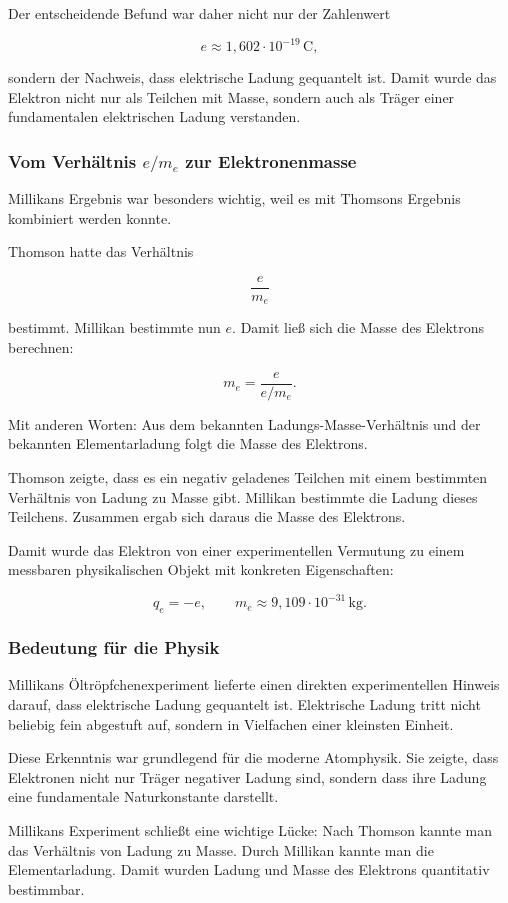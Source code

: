 Der entscheidende Befund war daher nicht nur der Zahlenwert

\[
e \approx 1{,}602 \cdot 10^{-19}\,\mathrm{C},
\]

sondern der Nachweis,
dass elektrische Ladung gequantelt ist.
Damit wurde das Elektron nicht nur als Teilchen mit Masse,
sondern auch als Träger einer fundamentalen elektrischen Ladung verstanden.

\subsubsection{Vom Verhältnis \texorpdfstring{\(e/m_e\)}{e/me} zur Elektronenmasse}
\label{subsubsec:verhaeltnis-em-zur-elektronenmasse}

Millikans Ergebnis war besonders wichtig,
weil es mit Thomsons Ergebnis kombiniert werden konnte.

Thomson hatte das Verhältnis

\[
\frac{e}{m_e}
\]

bestimmt.
Millikan bestimmte nun \(e\).
Damit ließ sich die Masse des Elektrons berechnen:

\[
m_e = \frac{e}{e/m_e}.
\]

Mit anderen Worten:
Aus dem bekannten Ladungs-Masse-Verhältnis und der bekannten
Elementarladung folgt die Masse des Elektrons.

\begin{PhysicsBox}
	\label{box:bedeutung-millikan}
	Thomson zeigte,
	dass es ein negativ geladenes Teilchen mit einem bestimmten Verhältnis
	von Ladung zu Masse gibt.
	Millikan bestimmte die Ladung dieses Teilchens.
	Zusammen ergab sich daraus die Masse des Elektrons.
\end{PhysicsBox}

Damit wurde das Elektron von einer experimentellen Vermutung
zu einem messbaren physikalischen Objekt mit konkreten Eigenschaften:

\[
q_e = -e,
\qquad
m_e \approx 9{,}109 \cdot 10^{-31}\,\mathrm{kg}.
\]

\subsubsection{Bedeutung für die Physik}
\label{subsubsec:bedeutung-millikan-fuer-physik}

Millikans Öltröpfchenexperiment lieferte einen direkten experimentellen
Hinweis darauf,
dass elektrische Ladung gequantelt ist.
Elektrische Ladung tritt nicht beliebig fein abgestuft auf,
sondern in Vielfachen einer kleinsten Einheit.

Diese Erkenntnis war grundlegend für die moderne Atomphysik.
Sie zeigte,
dass Elektronen nicht nur Träger negativer Ladung sind,
sondern dass ihre Ladung eine fundamentale Naturkonstante darstellt.

\begin{NoteBox}
	\label{box:einordnung-millikan}
	Millikans Experiment schließt eine wichtige Lücke:
	Nach Thomson kannte man das Verhältnis von Ladung zu Masse.
	Durch Millikan kannte man die Elementarladung.
	Damit wurden Ladung und Masse des Elektrons quantitativ bestimmbar.
\end{NoteBox}